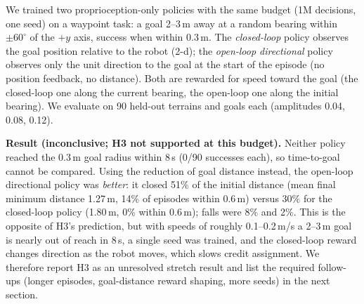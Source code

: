We trained two proprioception-only policies with the same budget (1M decisions, one seed) on a waypoint task: a goal 2--3\,m away at a random bearing within $\pm60^\circ$ of the $+y$ axis, success when within 0.3\,m. The \emph{closed-loop} policy observes the goal position relative to the robot (2-d); the \emph{open-loop directional} policy observes only the unit direction to the goal at the start of the episode (no position feedback, no distance). Both are rewarded for speed toward the goal (the closed-loop one along the current bearing, the open-loop one along the initial bearing). We evaluate on 90 held-out terrains and goals each (amplitudes 0.04, 0.08, 0.12).

\textbf{Result (inconclusive; H3 not supported at this budget).} Neither policy reached the 0.3\,m goal radius within 8\,s (0/90 successes each), so time-to-goal cannot be compared. Using the reduction of goal distance instead, the open-loop directional policy was \emph{better}: it closed 51\% of the initial distance (mean final minimum distance 1.27\,m, 14\% of episodes within 0.6\,m) versus 30\% for the closed-loop policy (1.80\,m, 0\% within 0.6\,m); falls were 8\% and 2\%. This is the opposite of H3's prediction, but with speeds of roughly 0.1--0.2\,m/s a 2--3\,m goal is nearly out of reach in 8\,s, a single seed was trained, and the closed-loop reward changes direction as the robot moves, which slows credit assignment. We therefore report H3 as an unresolved stretch result and list the required follow-ups (longer episodes, goal-distance reward shaping, more seeds) in the next section.
